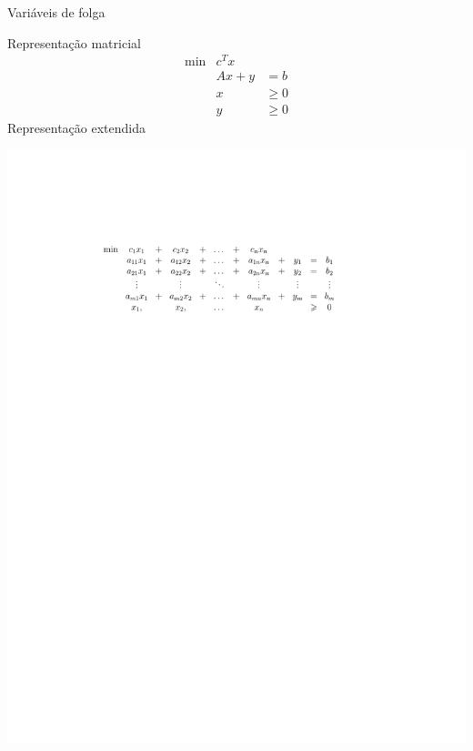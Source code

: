 \documentclass[compress,mathserif]{beamer}
\begin{document}
\begin{frame}{Variáveis de folga}

Representação matricial
    $$\begin{matrix}
        \min & c^Tx \\ 
             & Ax + y & = b \\
             & x & \geqslant 0 \\
             & y & \geqslant 0
        \end{matrix}    
$$
Representação extendida

\centering \includegraphics[width=\textwidth]{images/equation.pdf}
\end{frame}

\end{document}
